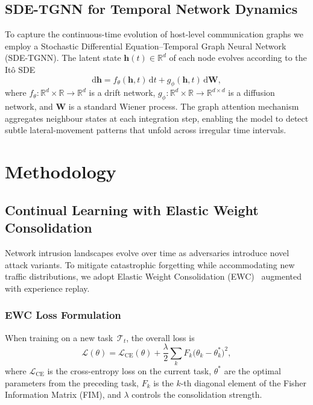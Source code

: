 \subsection{SDE-TGNN for Temporal Network Dynamics}
\label{sec:sde_tgnn}

To capture the continuous-time evolution of host-level communication
graphs we employ a Stochastic Differential Equation--Temporal Graph
Neural Network (SDE-TGNN).  The latent state
$\mathbf{h}(t)\in\mathbb{R}^{d}$ of each node evolves according to the
It\^{o} SDE
\begin{equation}
  \mathrm{d}\mathbf{h}
  = f_\theta(\mathbf{h},t)\,\mathrm{d}t
    + g_\phi(\mathbf{h},t)\,\mathrm{d}\mathbf{W},
  \label{eq:sde}
\end{equation}
where $f_\theta\colon\mathbb{R}^{d}\times\mathbb{R}\to\mathbb{R}^{d}$
is a drift network, $g_\phi\colon\mathbb{R}^{d}\times\mathbb{R}\to
\mathbb{R}^{d\times d}$ is a diffusion network, and $\mathbf{W}$ is a
standard Wiener process.  The graph attention mechanism aggregates
neighbour states at each integration step, enabling the model to detect
subtle lateral-movement patterns that unfold across irregular time
intervals.


\section{Methodology}
\label{sec:methodology}

\subsection{Continual Learning with Elastic Weight Consolidation}
\label{sec:ewc}

Network intrusion landscapes evolve over time as adversaries introduce
novel attack variants.  To mitigate catastrophic forgetting while
accommodating new traffic distributions, we adopt Elastic Weight
Consolidation (EWC)~\cite{kirkpatrick2017overcoming} augmented with
experience replay.

\subsubsection{EWC Loss Formulation}
When training on a new task~$\mathcal{T}_t$, the overall loss is
\begin{equation}
  \mathcal{L}(\theta)
  = \mathcal{L}_{\mathrm{CE}}(\theta)
    + \frac{\lambda}{2}\sum_{k}F_k\bigl(\theta_k - \theta_k^{*}\bigr)^{2},
  \label{eq:ewc}
\end{equation}
where $\mathcal{L}_{\mathrm{CE}}$ is the cross-entropy loss on the
current task, $\theta^{*}$ are the optimal parameters from the preceding
task, $F_k$ is the $k$-th diagonal element of the Fisher Information
Matrix (FIM), and $\lambda$ controls the consolidation strength.

